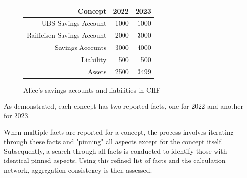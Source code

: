 \begin{figure}[H]
    \caption{Alice's savings accounts and liabilities in CHF}
    \label{fig:example_facts_aggregation_consistency}
    \centering 
    \begin{tabular}{|r|r|r|}
        \hline
        \textbf{Concept} & \textbf{2022} & \textbf{2023} \\ \hline
        UBS Savings Account & 1000 & 1000 \\ \hline
        Raiffeisen Savings Account & 2000 & 3000 \\ \hline
        Savings Accounts & 3000 & 4000 \\ \hline
        Liability & 500 & 500 \\ \hline
        Assets & 2500 & 3499 \\ \hline
    \end{tabular}
\end{figure}





As demonstrated, each concept has two reported facts, one for 2022 and another for 2023.

When multiple facts are reported for a concept, the process involves iterating through these facts and "pinning" all aspects except for the concept itself.  
Subsequently, a search through all facts is conducted to identify those with identical pinned aspects.  
Using this refined list of facts and the calculation network, aggregation consistency is then assessed.

